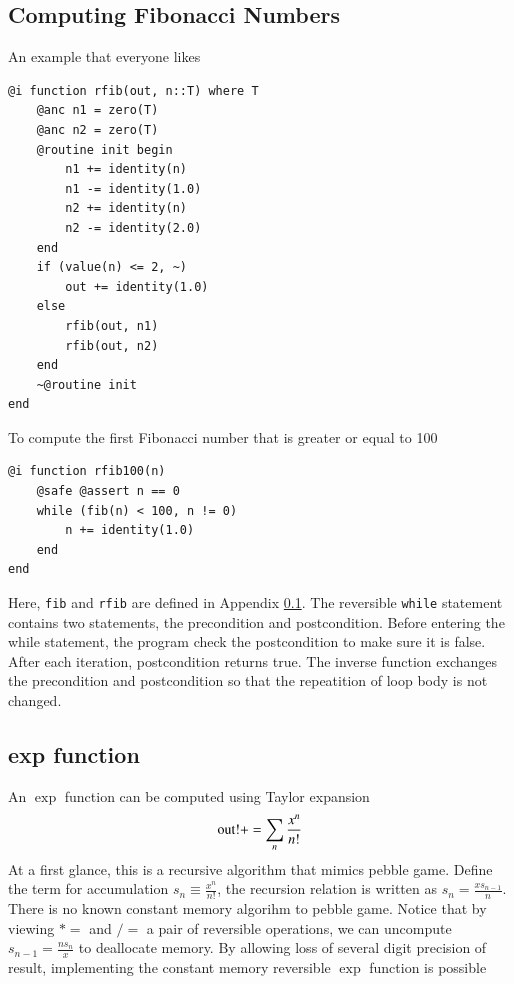 \documentclass[aps,twocolumn,longbibliography,english,superscriptaddress,prr]{revtex4-1}
\newcommand{\<}{\langle}
\renewcommand{\>}{\rangle}
\newcommand{\App}[1]{Appendix \ref{#1}}
\theoremstyle{definition}\newtheorem{definition}{\textit{Definition}}
\begin{document}
\subsection{Computing Fibonacci Numbers}\label{sec:fib}
An example that everyone likes

\begin{minipage}{.44\textwidth}
\begin{lstlisting}
@i function rfib(out, n::T) where T
    @anc n1 = zero(T)
    @anc n2 = zero(T)
    @routine init begin
        n1 += identity(n)
        n1 -= identity(1.0)
        n2 += identity(n)
        n2 -= identity(2.0)
    end
    if (value(n) <= 2, ~)
        out += identity(1.0)
    else
        rfib(out, n1)
        rfib(out, n2)
    end
    ~@routine init
end
\end{lstlisting}
\end{minipage}

To compute the first Fibonacci number that is greater or equal to 100

\begin{minipage}{.44\textwidth}
\begin{lstlisting}
@i function rfib100(n)
    @safe @assert n == 0
    while (fib(n) < 100, n != 0)
        n += identity(1.0)
    end
end
\end{lstlisting}
\end{minipage}

Here, \texttt{fib} and \texttt{rfib} are defined in \App{sec:fib}.
The reversible \texttt{while} statement contains two statements, the precondition and postcondition.
Before entering the while statement, the program check the postcondition to make sure it is false.
After each iteration, postcondition returns true. The inverse function exchanges the precondition and postcondition so that the repeatition of loop body is not changed.

\subsection{exp function}\label{sec:exp}
An $\exp$ function can be computed using Taylor expansion
\begin{equation}
    {\rm out!} += \sum\limits_n \frac{x^n}{n!}
\end{equation}
At a first glance, this is a recursive algorithm that mimics pebble game.
Define the term for accumulation $s_n \equiv \frac{x^n}{n!}$, the recursion relation is written as $s_n = \frac{x s_{n-1}}{n}$.
There is no known constant memory algorihm to pebble game.
Notice that by viewing $*=$ and $/=$ a pair of reversible operations, we can uncompute $s_{n-1} = \frac{n s_n}{x}$ to deallocate memory.
By allowing loss of several digit precision of result, implementing the constant memory reversible $\exp$ function is possible
\end{document}
